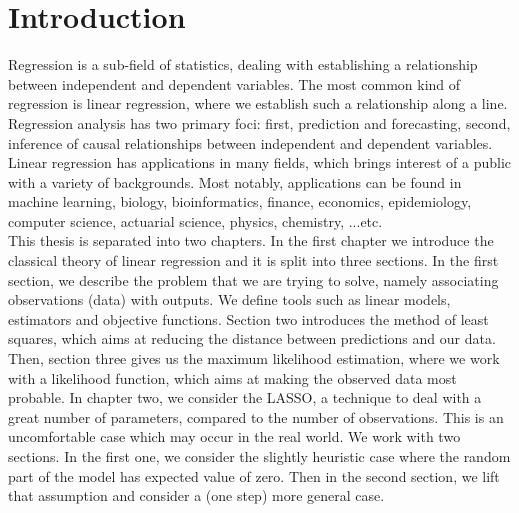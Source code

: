\chapter{Introduction}

Regression is a sub-field of statistics, dealing with establishing a relationship between independent and dependent variables. The most common kind of regression is linear regression, where we establish such a relationship along a line. Regression analysis has two primary foci: first, prediction and forecasting, second, inference of causal relationships between independent and dependent variables. Linear regression has applications in many fields, which brings interest of a public with a variety of backgrounds. Most notably, applications can be found in machine learning, biology, bioinformatics, finance, economics, epidemiology, computer science, actuarial science, physics, chemistry, ...etc. \\
This thesis is separated into two chapters. In the first chapter we introduce the classical theory of linear regression and it is split into three sections. In the first section, we describe the problem that we are trying to solve, namely associating observations (data) with outputs. We define tools such as linear models, estimators and objective functions. Section two introduces the method of least squares, which aims at reducing the distance between predictions and our data. Then, section three gives us the maximum likelihood estimation, where we work with a likelihood function, which aims at making the observed data most probable. In chapter two, we consider the LASSO, a technique to deal with a great number of parameters, compared to the number of observations. This is an uncomfortable case which may occur in the real world. We work with two sections. In the first one, we consider the slightly heuristic case where the random part of the model has expected value of zero. Then in the second section, we lift that assumption and consider a (one step) more general case.
